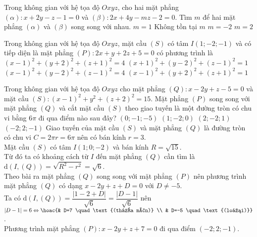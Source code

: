 \begin{ex}%
	Trong không gian với hệ tọa độ $Oxyz$, cho hai mặt phẳng $\left(\alpha \right)\colon  x+2y-z-1=0$ và $\left(\beta \right)\colon  2x+4y-mz-2=0$. Tìm $m$ để hai mặt phẳng $\left(\alpha \right)$ và $\left(\beta \right)$ song song với nhau.
	\choice
	{$m=1$}
	{\True Không tồn tại $m$}
	{$m=-2$}
	{$m=2$}
\end{ex}
\begin{ex}%
	Trong không gian với hệ tọa độ $Oxyz$, mặt cầu $(S)$ có tâm $I(1;-2;-1)$ và có tiếp diện là mặt phẳng $(P)\colon 2x+y+2z+5=0$ có phương trình là
	\choice
	{$(x-1)^2+(y+2)^2+(z+1)^2=4$}
	{$(x+1)^2+(y-2)^2+(z-1)^2=1$}
	{$(x-1)^2+(y-2)^2+(z-1)^2=4$}
	{\True $(x-1)^2+(y+2)^2+(z+1)^2=1$}
\end{ex}
\begin{ex}%
	Trong không gian với hệ tọa độ $Oxyz$ cho mặt phẳng $(Q)\colon x-2y+z-5=0$ và mặt cầu $(S)\colon (x-1)^2+y^2+(z+2)^2=15$. Mặt phẳng $(P)$ song song với mặt phẳng $(Q)$ và cắt mặt cầu $(S)$ theo giao tuyến là một đường tròn có chu vi bằng $6\pi$ đi qua điểm nào sau đây?
	\choice
	{$(0;-1;-5)$}
	{$(1;-2;0)$}
	{$(2;-2;1)$}
	{\True $(-2;2;-1)$}
	\loigiai
	{Giao tuyến của mặt cầu $(S)$ và mặt phẳng $(Q)$ là đường tròn có chu vi $C=2\pi r=6\pi$ nên có bán kính $r=3$.\\
		Mặt cầu $(S)$ có tâm $I(1;0;-2)$ và bán kính $R=\sqrt{15}$.\\
		Từ đó ta có khoảng cách từ $I$ đến mặt phẳng $(Q)$ cần tìm là $\mathrm{d}(I,(Q))=\sqrt{R^2-r^2}=\sqrt{6}$.\\
		Theo bài ra mặt phẳng $(Q)$ song song với mặt phẳng $(P)$ nên phương trình mặt phẳng $(Q)$ có dạng $x-2y+z+D=0$ với $D\neq -5$.\\
		Ta có $\mathrm{d}(I,(Q))=\dfrac{|1-2+D|}{\sqrt{6}}=\dfrac{|D-1|}{\sqrt{6}}$ nên $|D-1|=6\Leftrightarrow\hoac{& D=7 \quad \text{(thỏa mãn)} \\ & D=-5 \quad \text{(loại)}}$.\\
		Phương trình mặt phẳng $(P)\colon x-2y+z+7=0$ đi qua điểm $(-2;2;-1)$.
	}
\end{ex}

